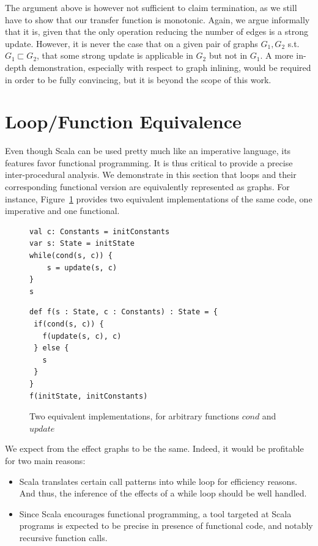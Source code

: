 The argument above is however not sufficient to claim termination, as we still have to show
that our transfer function is monotonic. Again, we argue informally that it is,
given that the only operation reducing the number of edges is a strong update.
However, it is never the case that on a given pair of graphs $G_1, G_2$ s.t.
$G_1 \sqsubset G_2$, that some strong update is applicable in $G_2$ but not
in $G_1$. A more in-depth demonstration, especially with respect to graph
inlining, would be required in order to be fully convincing, but it is beyond
the scope of this work.

\section{Loop/Function Equivalence}
Even though Scala can be used pretty much like an imperative language, its
features favor functional programming. It is thus critical to provide
a precise inter-procedural analysis. We demonstrate in this section that
loops and their corresponding functional version are equivalently represented
as graphs. For instance, Figure~\ref{fig:equiv:code} provides two equivalent
implementations of the same code, one imperative and one functional.

\begin{figure}[h]
\begin{minipage}[t]{0.5\linewidth}
    \centering
\begin{lstlisting}
val c: Constants = initConstants
var s: State = initState
while(cond(s, c)) {
    s = update(s, c)
}
s
\end{lstlisting}
\end{minipage}
\begin{minipage}[t]{0.5\linewidth}
    \centering
\begin{lstlisting}
def f(s : State, c : Constants) : State = {
 if(cond(s, c)) {
   f(update(s, c), c)
 } else {
   s
 }
}
f(initState, initConstants)
\end{lstlisting}
\end{minipage}
    \caption{Two equivalent implementations, for arbitrary functions $cond$ and $update$}
    \label{fig:equiv:code}
\end{figure}

We expect from the effect graphs to be the same. Indeed, it would be profitable
for two main reasons:
\begin{itemize}
    \item Scala translates certain call patterns into while loop for
efficiency reasons. And thus, the inference of the effects of a while loop
should be well handled.

    \item Since Scala encourages functional programming, a tool targeted at
Scala programs is expected to be precise in presence of functional code, and
notably recursive function calls.
\end{itemize}

